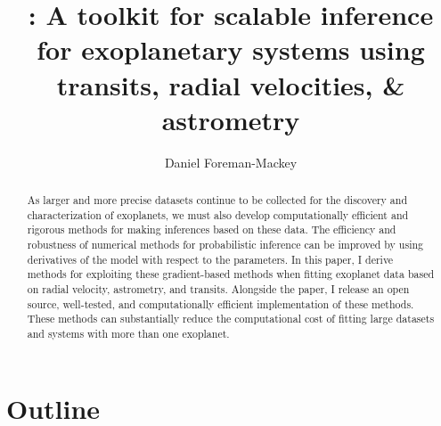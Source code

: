 \documentclass[modern]{aastex62}
\begin{document}
\raggedbottom\sloppy\sloppypar\frenchspacing

\title{%
:
A toolkit for scalable inference for exoplanetary systems using transits,
radial velocities, \& astrometry
}

\author[0000-0002-9328-5652]{Daniel Foreman-Mackey}

\begin{abstract}

As larger and more precise datasets continue to be collected for the discovery and characterization of exoplanets, we must also develop computationally efficient and rigorous methods for making inferences based on these data.
The efficiency and robustness of numerical methods for probabilistic inference
can be improved by using derivatives of the model with respect to the
parameters.
In this paper, I derive methods for exploiting these gradient-based methods
when fitting exoplanet data based on radial velocity, astrometry, and
transits.
Alongside the paper, I release an open source, well-tested, and
computationally efficient implementation of these methods.
These methods can substantially reduce the computational cost of fitting large
datasets and systems with more than one exoplanet.

\end{abstract}


\section{Outline}
\end{document}
